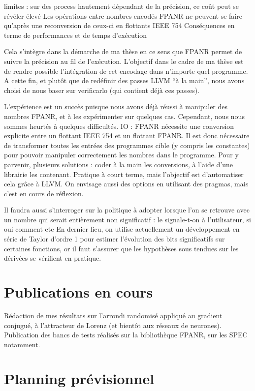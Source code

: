 \documentclass[a4paper,11pt]{article}
\begin{document}
limites : sur des process hautement dépendant de la précision, ce coût peut se révéler élevé
Les opérations entre nombres encodés FPANR ne peuvent se faire qu’après une reconversion de ceux-ci en flottants IEEE 754
Conséquences en terme de performances et de temps d’exécution



Cela s’intègre dans la démarche de ma thèse en ce sens que FPANR permet de suivre la précision au fil de l’exécution.
L’objectif dans le cadre de ma thèse est de rendre possible l’intégration de cet encodage dans n’importe quel programme.
A cette fin, et plutôt que de redéfinir des passes LLVM “à la main”, nous avons choisi de nous baser sur verificarlo (qui contient déjà ces passes).

L’expérience est un succès puisque nous avons déjà réussi à manipuler des nombres FPANR, et à les expérimenter sur quelques cas.
Cependant, nous nous sommes heurtés à quelques difficultés.
IO : FPANR nécessite une conversion explicite entre un flottant IEEE 754 et un flottant FPANR. Il est donc nécessaire de transformer toutes les entrées des programmes cible (y compris les constantes) pour pouvoir manipuler correctement les nombres dans le programme. 
Pour y parvenir, plusieurs solutions : coder à la main les conversions, à l’aide d’une librairie les contenant. Pratique à court terme, mais l’objectif est d’automatiser cela grâce à LLVM.
On envisage aussi des options en utilisant des pragmas, mais c’est en cours de réflexion.

Il faudra aussi s’interroger sur la politique à adopter lorsque l’on se retrouve avec un nombre qui serait entièrement non significatif : le signale-t-on à l’utilisateur, si oui comment etc
En dernier lieu, on utilise actuellement un développement en série de Taylor d’ordre 1 pour estimer l’évolution des bits significatifs sur certaines fonctions, or il faut s’assurer que les hypothèses sous tendues sur les dérivées se vérifient en pratique.


\section{Publications en cours}
Rédaction de mes résultats sur l'arrondi randomisé appliqué au gradient conjugué, à l'attracteur de Lorenz (et bientôt aux réseaux de neurones).
Publication des bancs de tests réalisés sur la bibliothèque FPANR, sur les SPEC notamment. %

\section{Planning prévisionnel}
\end{document}
